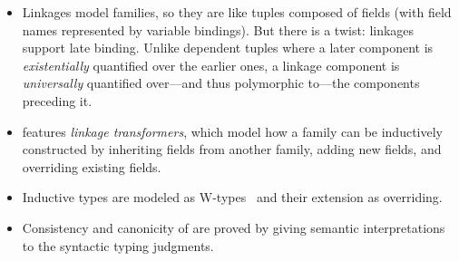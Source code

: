 \begin{itemize}
[labelsep=*,leftmargin=1pc,itemsep=3pt]
\item 
Linkages model families, so they are like tuples composed of fields
(with field names represented by variable bindings).
But there is a twist: linkages support late binding.
Unlike dependent tuples where a later component is \emph{existentially}
quantified over the earlier ones, a linkage component is \emph{universally}
quantified over---and thus polymorphic to---the components preceding it.%

\item
\TT features \emph{linkage transformers}, which model how a family can be
inductively constructed by inheriting fields from another family,
adding new fields, and overriding existing fields.
\item
Inductive types are modeled as W-types~\cite{martin1984intuitionistic} and their
extension as overriding.

\item
Consistency and canonicity of \TT are proved by giving semantic interpretations to the syntactic typing judgments.
\end{itemize}



% 



